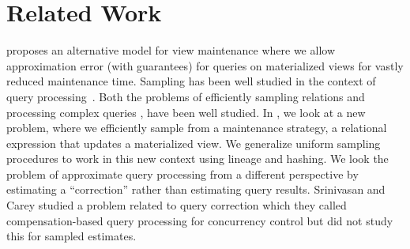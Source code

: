 \vspace{-0.75em}
\section{Related Work}\label{related}
\svc proposes an alternative model for view maintenance where we allow approximation error (with guarantees) for queries on materialized views for vastly reduced maintenance time.
Sampling has been well studied in the context of query processing~\cite{AgarwalMPMMS13, olken1993random, garofalakis2001approximate}. 
Both the problems of efficiently sampling relations \cite{olken1993random} and processing complex queries \cite{agarwalknowing}, have been well studied. 
In \svc, we look at a new problem, where we efficiently sample from a maintenance strategy, a relational expression that updates a materialized view.
We generalize uniform sampling procedures to work in this new context using lineage \cite{DBLP:journals/vldb/CuiW03} and hashing.
We look the problem of approximate query processing \cite{AgarwalMPMMS13, agarwalknowing} from a different perspective by estimating a ``correction'' rather than estimating query results. 
Srinivasan and Carey studied a problem related to query correction which they called compensation-based query processing \cite{srinivasanC92} for concurrency control but did not study this for sampled estimates.

